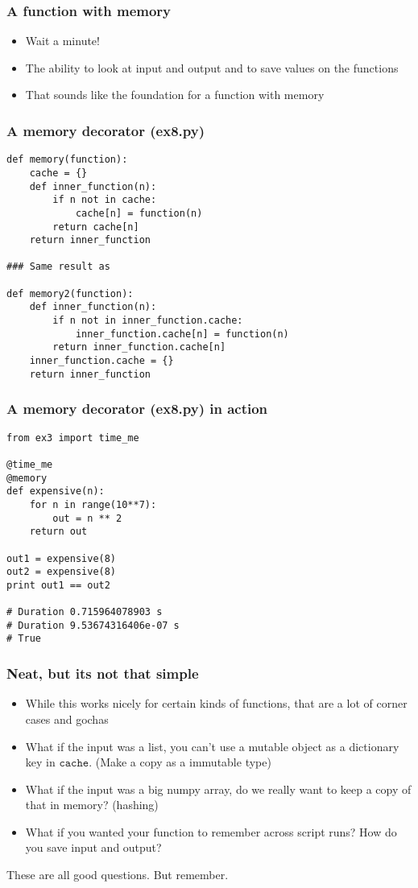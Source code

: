 \documentclass{beamer}
\begin{document}
\begin{frame}
  \frametitle{A function with memory}
  \begin{itemize}
  \item Wait a minute!
  \item The ability to look at input and output and to save values on the
    functions
  \item That sounds like the foundation for a function with memory
  \end{itemize}
\end{frame}

\begin{frame}[fragile]
  \frametitle{A memory decorator (ex8.py)}
\begin{verbatim}
def memory(function):
    cache = {}
    def inner_function(n):
        if n not in cache:
            cache[n] = function(n)
        return cache[n]
    return inner_function

### Same result as

def memory2(function):
    def inner_function(n):
        if n not in inner_function.cache:
            inner_function.cache[n] = function(n)
        return inner_function.cache[n]
    inner_function.cache = {}
    return inner_function
\end{verbatim}
\end{frame}

\begin{frame}[fragile]
  \frametitle{A memory decorator (ex8.py) in action}
\begin{verbatim}
from ex3 import time_me

@time_me
@memory
def expensive(n):
    for n in range(10**7):
        out = n ** 2
    return out

out1 = expensive(8)
out2 = expensive(8)
print out1 == out2

# Duration 0.715964078903 s
# Duration 9.53674316406e-07 s
# True
\end{verbatim}
\end{frame}

\begin{frame}
  \frametitle{Neat, but its not that simple}
  \begin{itemize}
  \item While this works nicely for certain kinds of functions, that are a lot
    of corner cases and gochas
  \item What if the input was a list, you can't use a mutable object as a
    dictionary key in $\texttt{cache}$. (Make a copy as a immutable type)
  \item What if the input was a big numpy array, do we really want to keep a
    copy of that in memory? (hashing)
  \item What if you wanted your function to remember across script runs? How
    do you save input and output?
  \end{itemize}
\end{frame}
\begin{block}
  These are all good questions. But remember.
\end{block}
\end{document}
